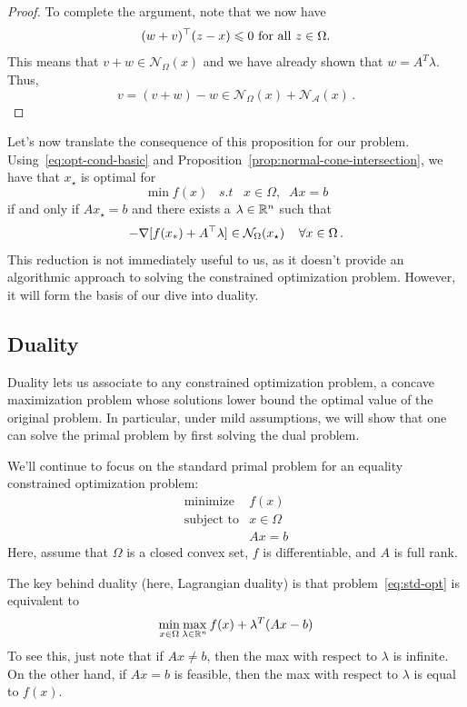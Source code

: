 \begin{proof}
To complete the argument, note that we now have
\[
 	 (w+v)^\top (z-x)  \leqslant 0 \text{ for all $z \in \Omega$.}
\]
This means that $v+w \in \mathcal{N}_{\Omega}(x)$ and we have already shown that $w = A^T\lambda$. Thus, 
\[
v = (v+w)-w \in \mathcal{N}_{\Omega}(x) + \mathcal{N}_{\mathcal{A}}(x)\,.
\]
\end{proof}



Let's now translate the consequence of this proposition for our problem.  Using~\eqref{eq:opt-cond-basic} and Proposition~\ref{prop:normal-cone-intersection}, we have that $x_\star$ is optimal for 
 $$ \min f(x)\;\;\; s.t \;\;\; x \in \Omega, \;\; Ax = b$$ 
 if and only if  $Ax_\star = b$ and there exists a $\lambda \in \mathbb{R}^n$ such that 
 $$ - \nabla [f(x_*) + A^\top \lambda] \in \mathcal{N}_{\Omega} (x_\star) \;\;\;\; \forall x \in \Omega\,.$$
 This reduction is not immediately useful to us, as it doesn't provide an algorithmic approach to solving the constrained optimization problem.  However, it will form the basis of our dive into duality.
 
 
\subsection{Duality}
 
 Duality lets us associate to any constrained optimization problem, a concave maximization problem whose solutions lower bound the optimal value of the original problem.  In particular, under mild assumptions, we will show that one can solve the primal problem by first solving the dual problem.  
 
We'll continue to focus on the standard primal problem for an equality constrained optimization problem:
  \begin{equation}\label{eq:std-opt}
  \begin{array}{ll}
  \text{minimize} & f(x) \\
  \text{subject to} & x\in\Omega\\
  &Ax = b
    \end{array}
  \end{equation}
 Here, assume that $\Omega$ is a closed convex set, $f$ is differentiable, and $A$ is full rank.
 
 The key behind duality (here, Lagrangian duality) is that problem~\eqref{eq:std-opt} is equivalent to
\[
\min_{x \in \Omega} \max_{\lambda \in \mathbb{R}^n} f(x) + \lambda^T(Ax-b)
\]
To see this, just note that if $Ax\neq b$, then the max with respect to $\lambda$ is infinite.  On the other hand, if $Ax=b$ is feasible, then the max with respect to $\lambda$ is equal to $f(x)$.
 
